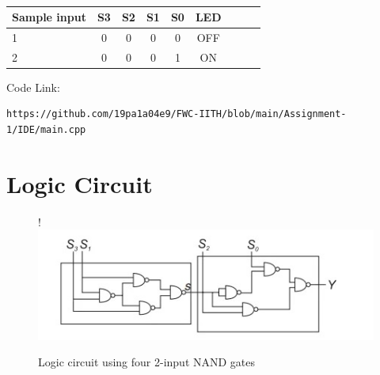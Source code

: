 \documentclass[10pt, a4paper]{article}
\begin{document}
\begin{table}[htbp]
 \begin{center}
    \begin{tabular}{|l|c|c|c|c|c|c|c|c} \hline \textbf{Sample input}
  & \textbf{S3} & \textbf{S2} & \textbf{S1}& \textbf{S0}& \textbf{LED } \\
 \hline
1&0&0&0&0&OFF\\ \hline
2&0&0&0&1&ON \\ \hline
\end{tabular}   
\end{center}
\caption{\label{table:dummytable} }
\end{table}
\vspace{3mm}
Code Link:
\begin{lstlisting}
https://github.com/19pa1a04e9/FWC-IITH/blob/main/Assignment-1/IDE/main.cpp
\end{lstlisting}
\pagebreak

\section{Logic Circuit}
\begin{figure}[!h]
\resizebox {\columnwidth} {!} {
\includegraphics[width=1\columnwidth]{Logic Circuit.jpg}
}
\caption{Logic circuit using four 2-input NAND gates}

\end{figure}
\end{document}
